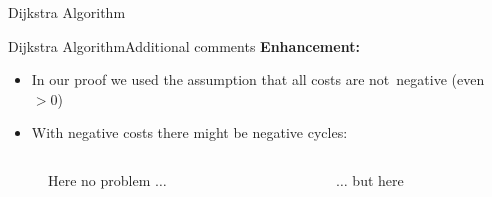 
\begin{frame}{Dijkstra Algorithm}
  \vspace{-1em}
  \begin{figure}[!h]
    \begin{adjustbox}{width=\linewidth}
      \def\DijkstraReverse{1}%
      
    \end{adjustbox}
    \vspace{-2em}
    \caption{%
    }
  \end{figure}
\end{frame}


\begin{frame}{Dijkstra Algorithm}{Additional comments}
  \textbf{Enhancement:}
  \begin{itemize}
    \item
      In our proof we used the assumption that all costs are
      {\color{MainA}not~negative} (even $> 0$)
    \item
      With {\color{MainA}negative costs} there might be
      {\color{MainA}negative cycles}:
  \end{itemize}
  \begin{columns}
    \begin{column}{0.4\linewidth}
      \begin{figure}[!h]
        \begin{adjustbox}{width=0.7\linewidth}
          
        \end{adjustbox}
        \caption{Here no problem $\ldots$}
      \end{figure}
    \end{column}
    \begin{column}{0.4\linewidth}
      \begin{figure}[!h]
        \begin{adjustbox}{width=0.7\linewidth}
          \def\DijkstraNegativeCycle{0}%
          
        \end{adjustbox}
        \caption{$\ldots$ but here}
      \end{figure}
    \end{column}
  \end{columns}
\end{frame}

